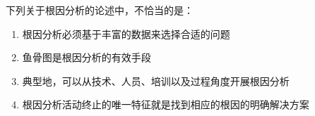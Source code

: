 \begin{problem}
	下列关于根因分析的论述中，不恰当的是： 
        \begin{enumerate}[label=\Alph*.]
            \item 根因分析必须基于丰富的数据来选择合适的问题
            \item 鱼骨图是根因分析的有效手段
            \item 典型地，可以从技术、人员、培训以及过程角度开展根因分析
            \item 根因分析活动终止的唯一特征就是找到相应的根因的明确解决方案
        \end{enumerate}
\end{problem}

